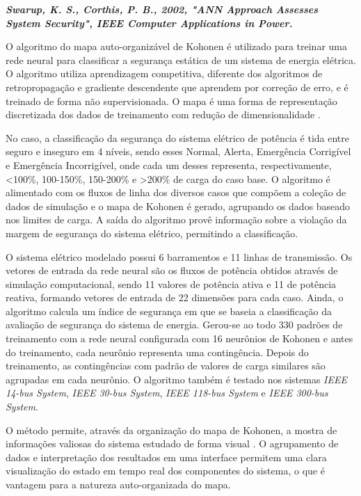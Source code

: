 \documentclass[12pt,oneside,a4paper,chapter=TITLE,section=TITLE,sumario=tradicional,english,brazil]{abntex2}
\begin{document}
\textbf{\textit{Swarup, K. S., Corthis, P. B., 2002, "ANN Approach Assesses System Security", IEEE Computer Applications in Power.}}\par
O algoritmo do mapa auto-organizável de Kohonen é utilizado para treinar uma rede neural para classificar a segurança estática de um sistema de energia elétrica. O algoritmo utiliza aprendizagem competitiva, diferente dos algoritmos de retropropagação e gradiente descendente que aprendem por correção de erro, e é treinado de forma não supervisionada. O mapa é uma forma de representação discretizada dos dados de treinamento com redução de dimensionalidade \cite{kohonen1990}.\par
No caso, a classificação da segurança do sistema elétrico de potência é tida entre seguro e inseguro em 4 níveis, sendo esses Normal, Alerta, Emergência Corrigível e Emergência Incorrigível, onde cada um desses representa, respectivamente, <100\%, 100-150\%, 150-200\% e >200\% de carga do caso base. O algoritmo é alimentado com os fluxos de linha dos diversos casos que compõem a coleção de dados de simulação e o mapa de Kohonen é gerado, agrupando os dados baseado nos limites de carga. A saída do algoritmo provê informação sobre a violação da margem de segurança do sistema elétrico, permitindo a classificação.\par 
O sistema elétrico modelado possui 6 barramentos e 11 linhas de transmissão. Os vetores de entrada da rede neural são os fluxos de potência obtidos através de simulação computacional, sendo 11 valores de potência ativa e 11 de potência reativa, formando vetores de entrada de 22 dimensões para cada caso. Ainda, o algoritmo calcula um índice de segurança em que se baseia a classificação da avaliação de segurança do sistema de energia. Gerou-se ao todo 330 padrões de treinamento com a rede neural configurada com 16 neurônios de Kohonen e antes do treinamento, cada neurônio representa uma contingência. Depois do treinamento, as contingências com padrão de valores de carga similares são agrupadas em cada neurônio. O algoritmo também é testado nos sistemas \textit{IEEE 14-bus System}, \textit{IEEE 30-bus System}, \textit{IEEE 118-bus System} e \textit{IEEE 300-bus System}.\par
 O método permite, através da organização do mapa de Kohonen, a mostra de informações valiosas do sistema estudado de forma visual \cite{kohonen1990}. O agrupamento de dados e interpretação dos resultados em uma interface permitem uma clara visualização do estado em tempo real dos componentes do sistema, o que é vantagem para a natureza auto-organizada do mapa.\par 
\end{document}
